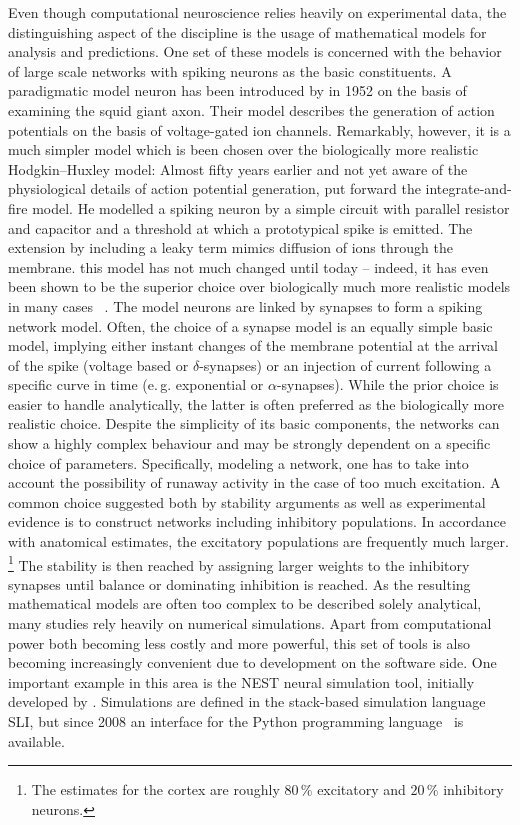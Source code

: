 Even though computational neuroscience relies heavily on experimental data, the distinguishing 
aspect of the discipline is the usage of mathematical models for analysis and predictions. 
One set of these models is concerned with the behavior of large scale networks with spiking 
neurons as the basic constituents. A paradigmatic model neuron has been introduced by 
 in 1952 on the basis of examining the squid giant axon. 
Their model describes the generation of action potentials on the basis of voltage-gated ion channels. 
Remarkably, however, it is a much simpler model which is been chosen over the biologically 
more realistic Hodgkin--Huxley model: 
Almost fifty years earlier and not yet aware of the physiological details of action potential
generation,  put forward the integrate-and-fire model.
He modelled a spiking neuron by a simple circuit 
with parallel resistor and capacitor and a threshold at which a prototypical spike 
is emitted. The extension by including a leaky term 
mimics diffusion of ions through the membrane.
this model has not much changed until today -- indeed, it has even been shown 
to be the superior choice over biologically much more realistic models in many cases%
~\cite{brette2015most}.
The model neurons are linked by synapses to form a spiking network model. Often, the choice 
of a synapse model is an equally simple basic model, implying either instant changes 
of the membrane potential at the arrival of the spike (voltage based or $\delta$-synapses) or an
injection of current following a specific curve in time (e.\,g. exponential or $\alpha$-synapses). 
While the prior choice is easier to handle analytically, the latter is often preferred as the 
biologically more realistic choice. 
Despite the simplicity of its basic components, the networks can show a highly complex behaviour
and may be strongly dependent on a specific choice of parameters. 
Specifically, modeling a network, one has to take into account the possibility of 
runaway activity in the case of too much excitation. A common choice suggested both 
by stability arguments as well as experimental evidence is to construct networks 
including inhibitory populations. In accordance with anatomical estimates, 
the excitatory populations are frequently much larger.%
\footnote{
    The estimates for the cortex are roughly $80\,\%$ excitatory and $20\,\%$ inhibitory neurons.\cite{brunel2000}
}
The stability is then reached 
by assigning larger weights to the inhibitory synapses until balance or dominating inhibition
is reached. 
As the resulting mathematical models are often too complex to be described 
solely analytical, many studies rely heavily on numerical simulations. 
Apart from computational power both becoming less costly and more powerful, this set of tools is 
also becoming increasingly convenient due to development on the software side. 
One important example in this area is the NEST neural simulation tool, initially developed
by . Simulations are defined in the stack-based simulation 
language SLI, but since 2008 an interface for the Python programming language~%
\cite{python} is available.

